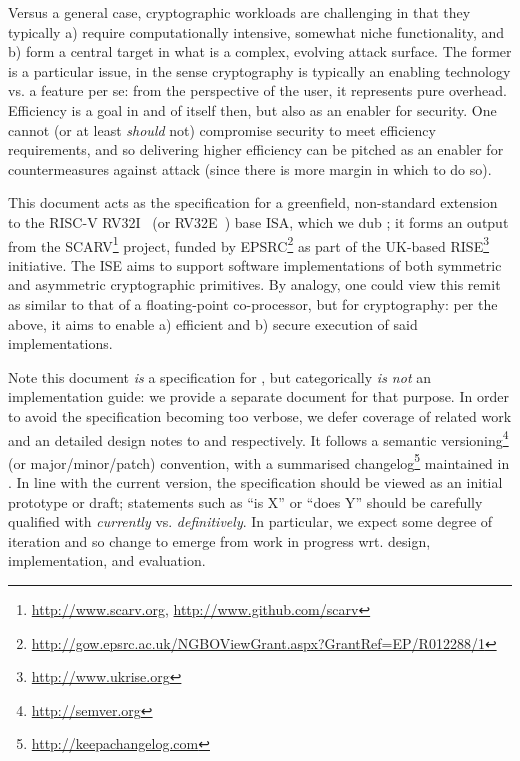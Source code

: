 
Versus a general case, cryptographic workloads are challenging in that they
typically
a) require computationally intensive, somewhat niche functionality,
   and
b) form a central target in what is a complex, evolving attack surface.
The former is a particular issue, in the sense cryptography is typically an
enabling technology vs. a feature per se: from the perspective of the user,
it represents pure overhead.  Efficiency is a goal in and of itself then, 
but also as an enabler for security.  One cannot (or at least {\em should} 
not) compromise security to meet efficiency requirements, and so delivering
higher efficiency can be pitched as an enabler for countermeasures against 
attack (since there is more margin in which to do so).

This document acts as the specification for a 
greenfield, non-standard extension~\cite[Section 21.1]{SCARV:RV:ISA:I:17} 
to the RISC-V 
RV32I~\cite[Section 2]{SCARV:RV:ISA:I:17} (or RV32E~\cite[Section 3]{SCARV:RV:ISA:I:17})
base ISA, which we dub \XCID; it forms an output from the SCARV\footnote{
\url{http://www.scarv.org}, \url{http://www.github.com/scarv}
} project, funded by EPSRC\footnote{
\url{http://gow.epsrc.ac.uk/NGBOViewGrant.aspx?GrantRef=EP/R012288/1}
} as part of the UK-based RISE\footnote{
\url{http://www.ukrise.org}
} initiative.
The \XCID ISE aims to support software implementations of both symmetric and 
asymmetric cryptographic primitives.  By analogy, one could view this remit
as similar to that of a floating-point co-processor, but for cryptography: 
per the above, it aims to enable
a) efficient
   and
b) secure
execution of said implementations.

Note this document {\em is} a specification for \XCID, but categorically
{\em is not} an implementation guide: we provide a separate document for 
that purpose.  In order to avoid the specification becoming too verbose,
we defer coverage of related work and an detailed design notes to
and
respectively.  It follows a semantic versioning\footnote{
\url{http://semver.org}
} (or major/minor/patch) convention, with a summarised changelog\footnote{
\url{http://keepachangelog.com}
} maintained in
.
In line with the current version, the specification should be viewed as an
initial prototype or draft; statements such as 
``\XCID is   X'' 
or
``\XCID does Y''
should be carefully qualified with {\em currently} vs. {\em definitively}.  
In particular, we expect some degree of iteration and so change to emerge 
from work in progress wrt. design, implementation, and evaluation.

